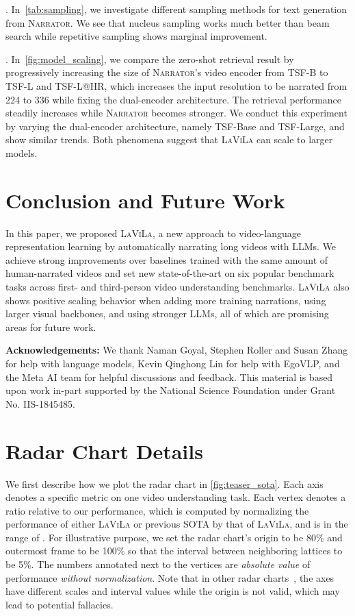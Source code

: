 \documentclass[10pt,twocolumn,letterpaper]{article}
\newcommand{\myparagraph}[1]{\vspace{0pt}\noindent{\bf #1}}
\newcommand{\ours}{\textsc{LaViLa}\xspace}
\newcommand{\narrator}{\textsc{Narrator}\xspace}
\begin{document}
\myparagraph{Sampling}.
In~\cref{tab:sampling}, we investigate different sampling methods for text generation from \narrator.
We see that nucleus sampling works much better than beam search while repetitive sampling shows marginal improvement.

\myparagraph{Scaling effect}.
In~\cref{fig:model_scaling}, we compare the zero-shot retrieval result by progressively increasing the size of \narrator's video encoder from TSF-B to TSF-L and TSF-L@HR, which increases the input resolution to be narrated from 224 to 336 while fixing the dual-encoder architecture.
The retrieval performance steadily increases while \narrator becomes stronger.
We conduct this experiment by varying the dual-encoder architecture, namely TSF-Base and TSF-Large, and show similar trends.
Both phenomena suggest that \ours can scale to larger models.

 \section{Conclusion and Future Work}

In this paper, we proposed \ours, a new approach to video-language representation learning by automatically narrating long videos with LLMs. We achieve strong improvements over baselines trained with the same amount of human-narrated videos and set new state-of-the-art on six popular benchmark tasks across first- and third-person video understanding benchmarks. \ours also shows positive scaling behavior when adding more training narrations, using larger visual backbones, and using stronger LLMs, all of which are promising areas for future work.
 
{\noindent \bf Acknowledgements:}
We thank Naman Goyal, Stephen Roller and Susan Zhang for help with language models,
Kevin Qinghong Lin for help with EgoVLP, and the Meta AI team for helpful discussions and feedback.
This material is based upon work in-part supported by the National Science Foundation under Grant No. IIS-1845485. 
{\small


}

\clearpage
\appendix

\section{Radar Chart  Details}
\label{sec:appdx:radar_chart}
We first describe how we plot the radar chart in \cref{fig:teaser_sota}.
Each axis denotes a specific metric on one video understanding task.
Each vertex denotes a ratio relative to our performance, which is computed by normalizing the performance of either \ours or previous SOTA by that of \ours, and is in the range of .
For illustrative purpose, we set the radar chart's origin to be 80\% and outermost frame to be 100\% so that the interval between neighboring lattices to be 5\%.
The numbers annotated next to the vertices are {\em absolute value} of performance {\em without normalization}.
Note that in other radar charts~\cite{yu2022coca,wang2022beitv3}, the axes have different scales and interval values while the origin is not valid, which may lead to potential fallacies.
\end{document}
